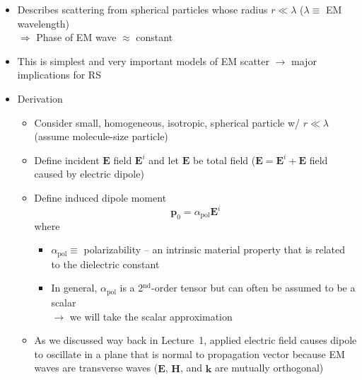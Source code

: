 \documentclass[11pt, oneside]{article}
\begin{document}
\begin{itemize}
	\item Describes scattering from spherical particles whose radius $r \ll \lambda$ ($\lambda \equiv$ EM wavelength)\\
	$\Rightarrow$ Phase of EM wave $\approx$ constant
	\item This is simplest and very important models of EM scatter $\rightarrow$ major implications for RS
	\item Derivation
	\begin{itemize}
		\item[--] Consider small, homogeneous, isotropic, spherical particle w/ $r \ll \lambda$ (assume molecule-size particle)
		\item[--] Define incident $\mathbf{E}$ field $\mathbf{E}^i$ and let $\mathbf{E}$ be total field ($\mathbf{E} = \mathbf{E}^i + \mathbf{E}$ field caused by electric dipole)
		\item[--] Define induced dipole moment
		\begin{equation}
			\label{e:p0}
			\mathbf{p}_0 = \alpha_\mathrm{pol}\mathbf{E}^i
		\end{equation}
		where
		\begin{itemize}
			\item[] $\alpha_\mathrm{pol} \equiv$ polarizability -- an intrinsic material property that is related to the dielectric constant
			\item[$\hookrightarrow$] In general, $\alpha_\mathrm{pol}$ is a 2$^\text{nd}$-order tensor but can often be assumed to be a scalar\\
			$\rightarrow$ we will take the scalar approximation
		\end{itemize}
		\item[--] As we discussed way back in Lecture~1, applied electric field causes dipole to oscillate in a plane that is normal to propagation vector because EM waves are transverse waves ($\mathbf{E}$, $\mathbf{H}$, and $\hat{\mathbf{k}}$ are mutually orthogonal)

\end{itemize}
\end{itemize}
\end{document}
